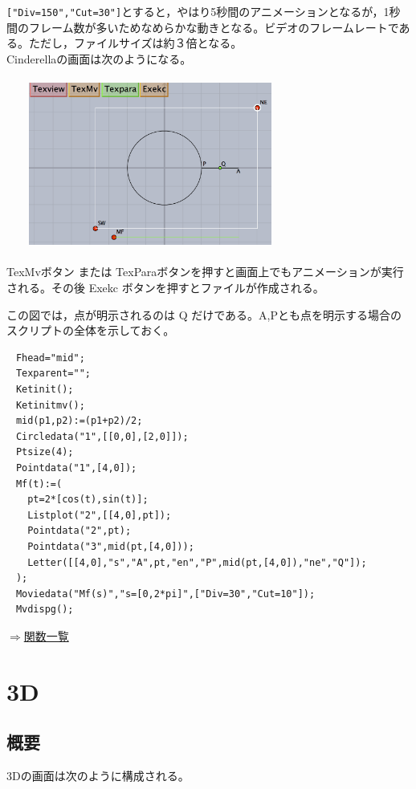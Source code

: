 \documentclass[papersize,a4paper,12pt,uplatex]{jsarticle}
\begin{document}
\begin{description}
\verb|["Div=150","Cut=30"]|とすると，やはり5秒間のアニメーションとなるが，1秒間のフレーム数が多いためなめらかな動きとなる。ビデオのフレームレートである。ただし，ファイルサイズは約３倍となる。\\
Cinderellaの画面は次のようになる。\\
　\\
　　\includegraphics[bb=0 0 1054 706 , width=8cm]{Figmv/moviedata01.png}\\
　\\
TexMvボタン または TexParaボタンを押すと画面上でもアニメーションが実行される。その後 Exekc ボタンを押すとファイルが作成される。

この図では，点が明示されるのは Q だけである。A,Pとも点を明示する場合のスクリプトの全体を示しておく。
\begin{verbatim}
　Fhead="mid";
　Texparent="";
　Ketinit();
　Ketinitmv();
　mid(p1,p2):=(p1+p2)/2;
　Circledata("1",[[0,0],[2,0]]);
　Ptsize(4);
　Pointdata("1",[4,0]);
　Mf(t):=(
　  pt=2*[cos(t),sin(t)];
　  Listplot("2",[[4,0],pt]);
　  Pointdata("2",pt);
　  Pointdata("3",mid(pt,[4,0]));
　  Letter([[4,0],"s","A",pt,"en","P",mid(pt,[4,0]),"ne","Q"]);  
　);
　Moviedata("Mf(s)","s=[0,2*pi]",["Div=30","Cut=10"]);
　Mvdispg();
\end{verbatim}
\begin{flushright} \hyperlink{functionlist3d}{$\Rightarrow$関数一覧}\end{flushright}

\end{description}

\newpage


\section{\ketcindy 3D}
\subsection{概要}
\ketcindy 3Dの画面は次のように構成される。
\end{document}
